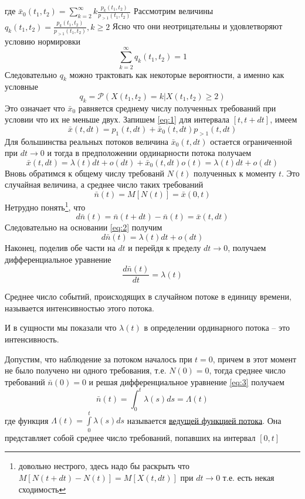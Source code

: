 где $\bar{x}_0 (t_1, t_2) = \sum_{k=2}^{\infty}{k \frac{p_k (t_1, t_2)}{p_{>1} (t_1, t_2)}}$
Рассмотрим величины $q_k (t_1, t_2) = \frac{p_k (t_1, t_2)}{p_{>1} (t_1, t_2)}, k \geq 2$
Ясно что они неотрицательны и удовлетворяют условию нормировки
$$\sum_{k=2}^{\infty}{q_k (t_1, t_2)} = 1$$
Следовательно $q_k$ можно трактовать как некоторые вероятности, а именно как условные
$$q_k = \mathcal{P}\left(X(t_1, t_2) = k | X(t_1, t_2) \geq 2\right)$$
Это означает что $\bar{x}_0$ равняется среднему числу полученных требований при условии что их не меньше двух. Запишем \eqref{eq:1} для интервала $[t, t + dt]$, имеем 
$$\bar{x}(t, dt) = p_1 (t, dt) + \bar{x}_0 (t, dt)p_{>1}(t, dt)$$
Для большинства реальных потоков величина $\bar{x}_0 (t, dt)$ остается ограниченной при $dt \to 0$ и тогда в предположении ординарности потока получаем
\begin{equation}\label{eq:2}
	\bar{x}(t, dt) = \lambda(t)dt + o(dt) + \bar{x}_0 (t, dt) o(t) = \lambda(t)dt + o(dt)
\end{equation}
Вновь обратимся к общему числу требованй $N(t)$ полученных к моменту $t$. Это случайная величина, а среднее число таких требований
$$\bar{n}(t) = M[N(t)] = \bar{x}(0, t)$$
Нетрудно понять\footnote{довольно нестрого, здесь надо бы раскрыть что $M[N(t + dt) - N(t)] = M[X(t, dt)]$ при $dt \to 0$ т.е. есть некая сходимость}, что 
$$d\bar{n}(t) = \bar{n}(t + dt) - \bar{n}(t) = \bar{x}(t, dt)$$
Следовательно на основании \eqref{eq:2} получим
$$d\bar{n}(t) = \lambda(t)dt + o(dt)$$
Наконец, поделив обе части на $dt$ и перейдя к пределу $dt \to 0$, получаем дифференциальное уравнение
\begin{equation}
	\frac{d\bar{n}(t)}{dt} = \lambda(t)
\end{equation}
\begin{definition}\label{eq:3}
	Среднее число событий, происходящих в случайном потоке в единицу времени, называется {\color{red}интенсивностью} этого потока.
\end{definition}
И в сущности мы показали что $\lambda(t)$ в определении ординарного потока -- это интенсивность.

Допустим, что наблюдение за потоком началось при $t = 0$, причем в этот момент не было получено ни одного требования, т.е. $N(0) = 0$, тогда среднее число требований
$\bar{n}(0) = 0$ и решая дифференциальное уравнение \eqref{eq:3} получаем
$$\bar{n}(t) = \int_{0}^{t}{\lambda(s)ds} = \Lambda(t)$$
где функция $\Lambda(t) = \int\limits_{0}^{t}{\lambda(s)ds}$ называется \underline{ведущей функцией потока}. Она представляет собой среднее число требований, попавших на интервал $[0, t]$